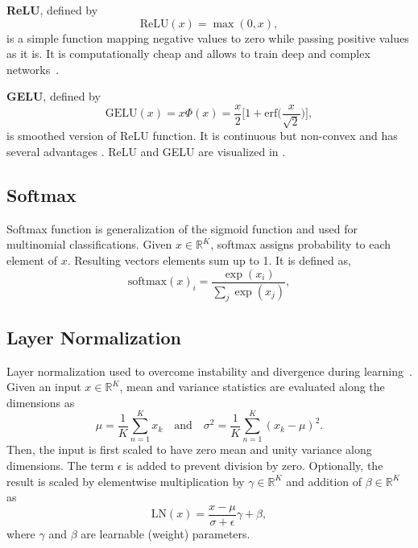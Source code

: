 \textbf{ReLU}, defined by
\begin{equation}
\label{eqn:relu_fcn}
\textrm{ReLU}(x) = \max(0, x),
\end{equation}
is a simple function mapping negative values to zero while passing positive values as it is. It is computationally cheap and allows to train deep and complex networks~\cite{glorot_deep_2011}.

\textbf{GELU}, defined by
\begin{equation}
\label{eqn:gelu_fcn}
\textrm{GELU}(x) = x \Phi(x) = \frac{x}{2} \bigg[ 1 + \textrm{erf} \Big( \frac{x}{\sqrt{2}} \Big) \bigg],
\end{equation}
is smoothed version of ReLU function. It is continuous but non-convex and has several advantages \cite{hendrycks_gaussian_2020}. ReLU and GELU are visualized in  . 

\subsection{Softmax}

Softmax function is generalization of the sigmoid function and used for multinomial classifications. 
Given $x \in \mathbb{R}^K$, softmax assigns probability to each element of $x$. 
Resulting vectors elements sum up to 1.
It is defined as,
\begin{equation}
\label{eqn:softmax_fcn}
\text{softmax}(x)_i = \frac{\exp(x_i)}{\sum_j \exp(x_j)},
\end{equation}

\subsection{Layer Normalization}

Layer normalization used to overcome instability and divergence during learning~\cite{ba_layer_2016}. 
Given an input $x \in \mathbb{R}^K$, mean and variance statistics are evaluated along the dimensions as  
\begin{equation}
\label{eq:layernorm_statistics}
\mu = \frac{1}{K} \sum_{n=1}^{K} x_k \quad \text{and} \quad
\sigma^2 = \frac{1}{K} \sum_{n=1}^{K} (x_k-\mu)^2.
\end{equation} 
Then, the input is first scaled to have zero mean and unity variance along dimensions. 
The term $\epsilon$ is added to prevent division by zero. 
Optionally, the result is scaled by elementwise multiplication by $\gamma \in \mathbb{R}^K$ and addition of $\beta \in \mathbb{R}^K$ as
\begin{equation}
\label{eqn:layernorm}
\mathrm{LN}(x) = \frac{x-\mu}{\sigma+\epsilon} \gamma + \beta,
\end{equation}
where $\gamma$ and $\beta$ are learnable (weight) parameters. 
